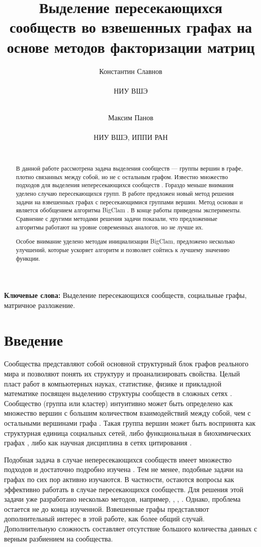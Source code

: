 \documentclass{ITaSconf}
\title{Выделение пересекающихся сообществ во взвешенных графах на основе методов факторизации матриц}
\author{
  Константин Славнов \\
  \begin{affiliation}
    НИУ ВШЭ
  \end{affiliation}\\
  \email{kaslavnov@edu.hse.ru}
  \and
  Максим Панов \\
  \begin{affiliation}
    НИУ ВШЭ, ИППИ РАН
  \end{affiliation}\\
  \email{panov.maxim@gmail.com}
}
\begin{document}
\maketitle

\begin{abstract}
	В данной работе рассмотрена задача выделения сообществ --- группы вершин в графе, плотно связанных между собой, но не с остальным графом. Известно множество подходов для выделения непересекающихся сообществ \cite{Fortunato10}. Гораздо меньше внимания уделено случаю пересекающихся групп. В работе предложен новый метод решения задачи на взвешенных графах с пересекающимися группами вершин. Метод основан и является обобщением алгоритма BigClam \cite{yang2013overlapping}.
	В конце работы приведены эксперименты. Сравнение с другими методами решения задачи показали, что предложенные алгоритмы работают на уровне современных аналогов, но не лучше их.
	
	Особое внимание уделено методам инициализации BigClam, предложено несколько улучшений, которые ускоряет алгоритм и позволяет сойтись к лучшему значению функции.
\end{abstract}

\textbf{Ключевые слова:} Выделение пересекающихся сообществ, социальные графы, матричное разложение.

\section{Введение}

Сообщества представляют собой основной структурный блок графов реального мира и позволяют понять их структуру и проанализировать свойства.
Целый пласт работ в компьютерных науках, статистике, физике и прикладной математике посвящен выделению структуры сообществ в сложных сетях \cite{Fortunato10}. Сообщество (группа или кластер) интуитивно может быть определено как множество вершин с большим количеством взаимодействий между собой, чем с остальными вершинами графа \cite{girvan2002community}. Такая группа вершин может быть воспринята как структурная единица социальных сетей, либо функциональная в биохимических графах \cite{krogan2006global}, либо как научная дисциплина в сетях цитирования \cite{backstrom2006group}. 

Подобная задача в случае непересекающихся сообществ имеет множество подходов и достаточно подробно изучена \cite{Fortunato10}. Тем не менее, подобные задачи на графах по сих пор активно изучаются. В частности, остаются вопросы как эффективно работать в случае пересекающихся сообществ.
Для решения этой задачи уже разработано несколько методов, например, \cite{airoldi2008mixed}, \cite{palla2005uncovering}, \cite{gregory2010finding}. Однако, проблема остается не до конца изученной. Взвешенные графы представляют дополнительный интерес в этой работе, как более общий случай. Дополнительную сложность составляет отсутствие большого количества данных с верным разбиением на сообщества.
\end{document}

